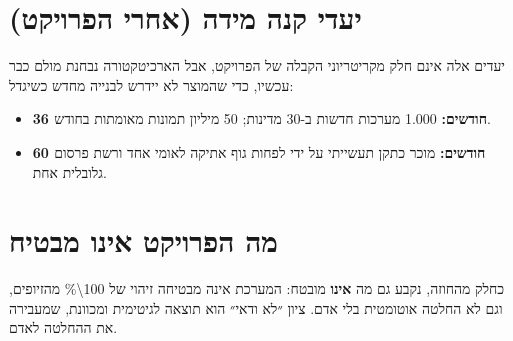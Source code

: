 \section{יעדי קנה מידה (אחרי הפרויקט)}
יעדים אלה אינם חלק מקריטריוני הקבלה של הפרויקט, אבל הארכיטקטורה נבחנת מולם כבר עכשיו, כדי שהמוצר לא יידרש לבנייה מחדש כשיגדל:
\begin{itemize}
\item \textbf{36 חודשים:} \num{1,000} מערכות חדשות ב-\num{30} מדינות; \num{50} מיליון תמונות מאומתות בחודש.
\item \textbf{60 חודשים:}  מוכר כתקן תעשייתי על ידי לפחות גוף אתיקה לאומי אחד ורשת פרסום גלובלית אחת.
\end{itemize}

\section{מה הפרויקט אינו מבטיח}
כחלק מהחוזה, נקבע גם מה \textbf{אינו} מובטח: המערכת אינה מבטיחה זיהוי של \num{100\%} מהזיופים, וגם לא החלטה אוטומטית בלי אדם. ציון ״לא ודאי״ הוא תוצאה לגיטימית ומכוונת, שמעבירה את ההחלטה לאדם.
